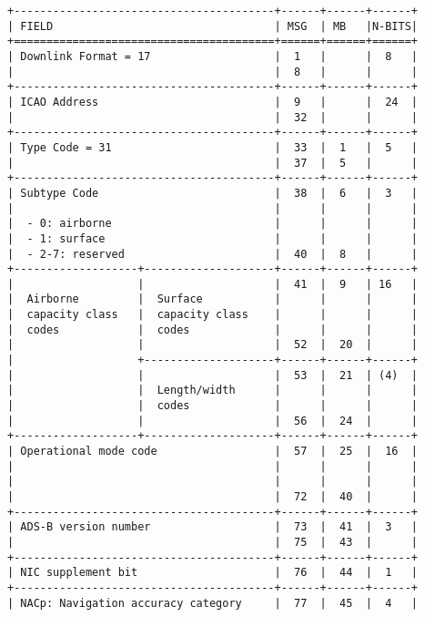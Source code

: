 \begin{verbatim}
+----------------------------------------+------+------+------+
| FIELD                                  | MSG  | MB   |N-BITS|
+========================================+======+======+======+
| Downlink Format = 17                   |  1   |      |  8   |
|                                        |  8   |      |      |
+----------------------------------------+------+------+------+
| ICAO Address                           |  9   |      |  24  |
|                                        |  32  |      |      |
+----------------------------------------+------+------+------+
| Type Code = 31                         |  33  |  1   |  5   |
|                                        |  37  |  5   |      |
+----------------------------------------+------+------+------+
| Subtype Code                           |  38  |  6   |  3   |
|                                        |      |      |      |
|  - 0: airborne                         |      |      |      |
|  - 1: surface                          |      |      |      |
|  - 2-7: reserved                       |  40  |  8   |      |
+-------------------+--------------------+------+------+------+
|                   |                    |  41  |  9   | 16   |
|  Airborne         |  Surface           |      |      |      |
|  capacity class   |  capacity class    |      |      |      |
|  codes            |  codes             |      |      |      |
|                   |                    |  52  |  20  |      |
|                   +--------------------+------+------+------+
|                   |                    |  53  |  21  | (4)  |
|                   |  Length/width      |      |      |      |
|                   |  codes             |      |      |      |
|                   |                    |  56  |  24  |      |
+-------------------+--------------------+------+------+------+
| Operational mode code                  |  57  |  25  |  16  |
|                                        |      |      |      |
|                                        |      |      |      |
|                                        |  72  |  40  |      |
+----------------------------------------+------+------+------+
| ADS-B version number                   |  73  |  41  |  3   |
|                                        |  75  |  43  |      |
+----------------------------------------+------+------+------+
| NIC supplement bit                     |  76  |  44  |  1   |
+----------------------------------------+------+------+------+
| NACp: Navigation accuracy category     |  77  |  45  |  4   |

\end{verbatim}
